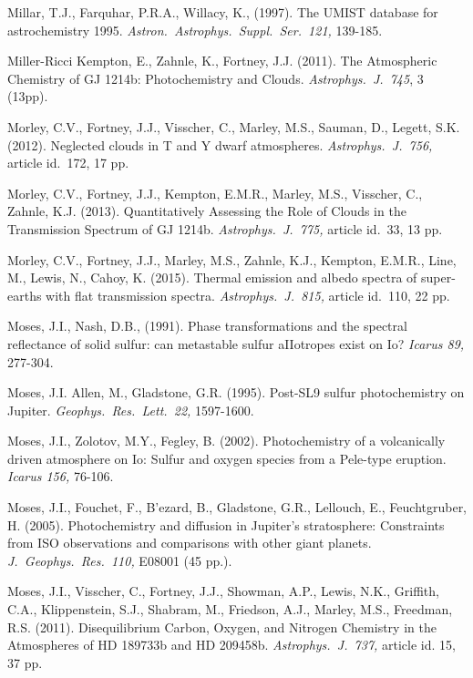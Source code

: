 \documentclass[preprint]{aastex}
\begin{document}
\begin{thebibliography}{00}
Millar, T.J., Farquhar, P.R.A., Willacy, K., (1997).
The UMIST database for astrochemistry 1995.
{\em Astron.\ Astrophys.\ Suppl.\ Ser.\ 121,} 139-185.
 
Miller-Ricci Kempton, E., Zahnle, K., Fortney, J.J. (2011). 
 The Atmospheric Chemistry of GJ 1214b: Photochemistry and Clouds.
 {\em Astrophys.\ J.\ 745}, 3 (13pp).
 
 Morley, C.V., Fortney, J.J., Visscher, C., Marley, M.S., Sauman, D., Legett, S.K. (2012).
 Neglected clouds in T and Y dwarf atmospheres.
 {\em Astrophys.\ J.\ 756,} article id.\ 172, 17 pp.

Morley, C.V., Fortney, J.J., Kempton, E.M.R., Marley, M.S., Visscher, C., Zahnle, K.J. (2013).
Quantitatively Assessing the Role of Clouds in the Transmission Spectrum of GJ 1214b.
{\em Astrophys.\ J.\ 775,} article id.\ 33, 13 pp.

Morley, C.V., Fortney, J.J., Marley, M.S., Zahnle, K.J., Kempton, E.M.R., Line, M., Lewis, N., Cahoy, K. (2015).
Thermal emission and albedo spectra of super-earths with flat transmission spectra.
{\em Astrophys.\ J.\ 815,} article id.\ 110, 22 pp.

Moses, J.I., Nash, D.B., (1991).
Phase transformations and the spectral reflectance of solid
sulfur: can metastable sulfur aIIotropes exist on Io?
{\em Icarus 89,} 277-304.

Moses, J.I. Allen, M., Gladstone, G.R. (1995).
Post-SL9 sulfur photochemistry on Jupiter.
{\em Geophys.\ Res.\ Lett.\ 22,} 1597-1600.

Moses, J.I., Zolotov, M.Y.,  Fegley, B. (2002).
 Photochemistry of a volcanically driven atmosphere on Io: Sulfur and oxygen species from a Pele-type eruption.
{\em Icarus 156,} 76-106.

Moses, J.I., Fouchet, F., B{'e}zard, B., Gladstone, G.R., Lellouch, E., Feuchtgruber, H. (2005).
Photochemistry and diffusion in Jupiter's stratosphere: Constraints from ISO observations and comparisons with other giant planets.
{\em J.\ Geophys.\ Res.\ 110,} E08001 (45 pp.).

Moses, J.I., Visscher, C., Fortney, J.J., Showman, A.P., Lewis, N.K., Griffith, C.A., Klippenstein, S.J., Shabram, M., Friedson, A.J., Marley, M.S., Freedman, R.S. (2011).
Disequilibrium Carbon, Oxygen, and Nitrogen Chemistry in the Atmospheres of HD 189733b and HD 209458b. 
{\em Astrophys.\ J.\ 737,} article id. 15, 37 pp.


\end{thebibliography}
\end{document}
